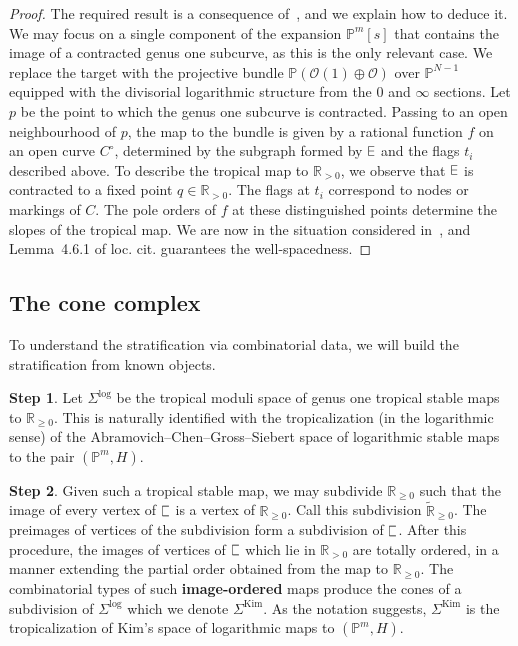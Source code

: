 \documentclass[11pt]{amsart}
\DeclareRobustCommand{\plE}{\text{\reflectbox{$\exists$}}}
\newcommand{\plC}{\scalebox{0.8}[1.3]{$\sqsubset$}}
\newcommand{\Kim}{\operatorname{Kim}}
\newcommand{\PP}{\mathbb P}
\newcommand{\RR}{\mathbb{R}}
\theoremstyle{definition}
\theoremstyle{definition}
\begin{document}
\begin{proof}
The required result is a consequence of~\cite[Section 4]{RSPW2}, and we explain how to deduce it. We may focus on a single component of the expansion $\mathbb P^m[s]$ that contains the image of a contracted genus one subcurve, as this is the only relevant case. We replace the target with the projective bundle $\mathbb P(\mathcal O(1)\oplus \mathcal O)$ over $\mathbb P^{N-1}$ equipped with the divisorial logarithmic structure from the $0$ and $\infty$ sections. Let $p$ be the point to which the genus one subcurve is contracted. Passing to an open neighbourhood of $p$, the map to the bundle is given by a rational function $f$ on an open curve $C^\circ$, determined by the subgraph formed by $\plE$ and the flags $t_i$ described above. To describe the tropical map to $\mathbb R_{>0}$, we observe that $\plE$ is contracted to a fixed point $q\in\mathbb R_{>0}$. The flags at $t_i$ correspond to nodes or markings of $C$. The pole orders of $f$ at these distinguished points determine the slopes of the tropical map. We are now in the situation considered in~\cite[Second Paragraph of \S~4.6]{RSPW2}, and Lemma~4.6.1 of loc. cit. guarantees the well-spacedness.
\end{proof}

\subsection{The cone complex} To understand the stratification via combinatorial data, we will build the stratification from known objects. \smallskip

\noindent
\textbf{Step 1}. Let $\Sigma^{\mathrm{log}}$ be the tropical moduli space of genus one tropical stable maps to $\mathbb R_{\geq 0}$. This is naturally identified with the tropicalization (in the logarithmic sense) of the Abramovich--Chen--Gross--Siebert space of logarithmic stable maps to the pair $(\mathbb P^m,H)$. \smallskip

\noindent
\textbf{Step 2}. Given such a tropical stable map, we may subdivide $\mathbb R_{\geq 0}$ such that the image of every vertex of $\plC$ is a vertex of $\mathbb R_{\geq 0}$. Call this subdivision $\widetilde{\mathbb R}_{\geq 0}$. The preimages of vertices of the subdivision form a subdivision of $\plC$. After this procedure, the images of vertices of $\plC$ which lie in $\RR_{>0}$ are totally ordered, in a manner extending the partial order obtained from the map to $\mathbb R_{\geq 0}$. The combinatorial types of such \textbf{image-ordered} maps produce the cones of a subdivision of $\Sigma^{\mathrm{log}}$ which we denote $\Sigma^{\mathrm{Kim}}$. As the notation suggests, $\Sigma^{\Kim}$ is the tropicalization of Kim's space of logarithmic maps to $(\PP^m,H)$.\smallskip
\end{document}
